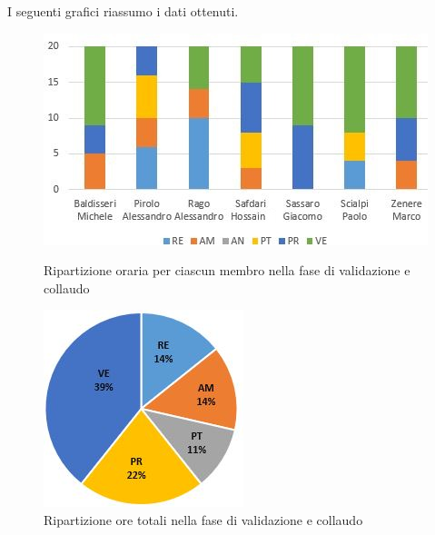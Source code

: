 I seguenti grafici riassumo i dati ottenuti.

\begin{figure}[!htb]
   \begin{minipage}{0.6\textwidth}
     \centering
     \includegraphics{Images/PO-Verifica}
     \caption{Ripartizione oraria per ciascun membro nella fase di validazione e collaudo}
   \end{minipage}\hspace{0.1\textwidth}
   \begin{minipage}{0.3\textwidth}
     \centering
     \includegraphics[width=.9\textwidth]{Images/PE-Verifica}
     \captionsetup{width=1\textwidth}
     \caption{Ripartizione ore totali nella fase di validazione e collaudo}
   \end{minipage}
\end{figure}